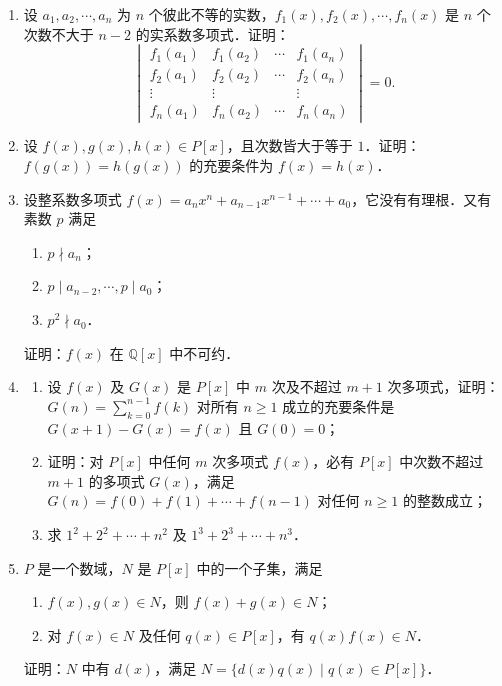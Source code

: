 \begin{enumerate}
  \ansproof
  \item 设 $a_1,a_2,\cdots,a_n$ 为 $n$ 个彼此不等的实数，$f_1(x),f_2(x),\cdots,f_n(x)$ 是 $n$ 个次数不大于 $n-2$ 的实系数多项式．证明：
  \[
    \begin{vmatrix}
      f_1(a_1) & f_1(a_2) & \cdots & f_1(a_n)\\
      f_2(a_1) & f_2(a_2) & \cdots & f_2(a_n)\\
      \vdots & \vdots & & \vdots\\
      f_n(a_1) & f_n(a_2) & \cdots & f_n(a_n)
    \end{vmatrix}=0.
  \]

  \ansproof
  \item 设 $f(x),g(x),h(x)\in P[x]$，且次数皆大于等于 $1$．证明：$f(g(x))=h(g(x))$ 的充要条件为 $f(x)=h(x)$．

  \ansproof
  \item 设整系数多项式 $f(x)=a_nx^n+a_{n-1}x^{n-1}+\cdots+a_0$，它没有有理根．又有素数 $p$ 满足
  \begin{enumerate}
    \item $p\nmid a_n$；
    \item $p\mid a_{n-2},\cdots,p\mid a_0$；
    \item $p^2\nmid a_0$．
  \end{enumerate}
  证明：$f(x)$ 在 $\mathbb{Q}[x]$ 中不可约．
  \ansproof

  \item
  \begin{enumerate}
    \item 设 $f(x)$ 及 $G(x)$ 是 $P[x]$ 中 $m$ 次及不超过 $m+1$ 次多项式，证明：$G(n)=\sum\limits_{k=0}^{n-1}f(k)$ 对所有 $n\geq 1$ 成立的充要条件是 $G(x+1)-G(x)=f(x)$ 且 $G(0)=0$；
  \anssub
    \item 证明：对 $P[x]$ 中任何 $m$ 次多项式 $f(x)$，必有 $P[x]$ 中次数不超过 $m+1$ 的多项式 $G(x)$，满足 $G(n)=f(0)+f(1)+\cdots+f(n-1)$ 对任何 $n\geq 1$ 的整数成立；
  \anssub
    \item 求 $1^2+2^2+\cdots+n^2$ 及 $1^3+2^3+\cdots+n^3$．
  \anssub
  \end{enumerate}

  \item $P$ 是一个数域，$N$ 是 $P[x]$ 中的一个子集，满足
  \begin{enumerate}
    \item $f(x),g(x)\in N$，则 $f(x)+g(x)\in N$；
    \item 对 $f(x)\in N$ 及任何 $q(x)\in P[x]$，有 $q(x)f(x)\in N$．
  \end{enumerate}
  证明：$N$ 中有 $d(x)$，满足 $N=\{d(x)q(x)\mid q(x)\in P[x]\}$．
  \ansproof


\end{enumerate}
